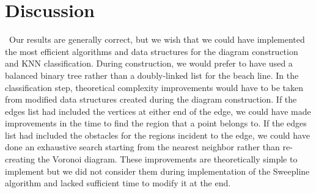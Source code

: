 \documentclass[conference]{IEEEtran}
\begin{document}
\section{Discussion}
\noindent\ Our results are generally correct, but we wish that we could have
implemented the most efficient algorithms and data structures for the diagram
construction and KNN classification. During construction, we would prefer to
have used a balanced binary tree rather than a doubly-linked list for the beach
line. In the classification step, theoretical complexity improvements would have
to be taken from modified data structures created during the diagram construction.
If the edges list had included the vertices at either end of the edge, we could
have made improvements in the time to find the region that a point belongs to.
If the edges list had included the obstacles for the regions incident to the
edge, we could have done an exhaustive search starting from the nearest neighbor
rather than re-creating the Voronoi diagram. These improvements are theoretically
simple to implement but we did not consider them during implementation of the
Sweepline algorithm and lacked sufficient time to modify it at the end.

%
%

\end{document}
